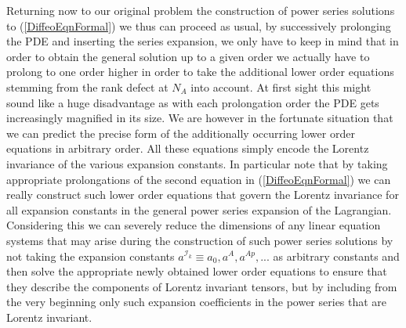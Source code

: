 \documentclass[a4paper,12pt, DIV=14, BCOR=5mm, twoside, headsepline, numbers=noenddot]{scrbook}
\begin{document}
Returning now to our original problem the construction of power series solutions to (\ref{DiffeoEqnFormal}) we thus can proceed as usual, by successively prolonging the PDE and inserting the series expansion, we only have to keep in mind that in order to obtain the general solution up to a given order we actually have to prolong to one order higher in order to take the additional lower order equations stemming from the rank defect at $N_A$ into account.  At first sight this might sound like a huge disadvantage as with each prolongation order the PDE gets increasingly magnified in its size. We are however in the fortunate situation that we can predict the precise form of the additionally occurring lower order equations in arbitrary order. All these equations simply encode the Lorentz invariance of the various expansion constants. In particular note that by taking appropriate prolongations of the second equation in (\ref{DiffeoEqnFormal}) we can really construct such lower order equations that govern the Lorentz invariance for all expansion constants in the general power series expansion of the Lagrangian. 
Considering this we can severely reduce the dimensions of any linear equation systems that may arise during the construction of such power series solutions by not taking the expansion constants $a^{\mathcal{I}_k} \equiv a_0, a^A, a^{Ap},...$ as arbitrary constants and then solve the appropriate newly obtained lower order equations to ensure that they describe the components of Lorentz invariant tensors, but by including from the very beginning only such expansion coefficients in the power series that are Lorentz invariant.\\
\end{document}

